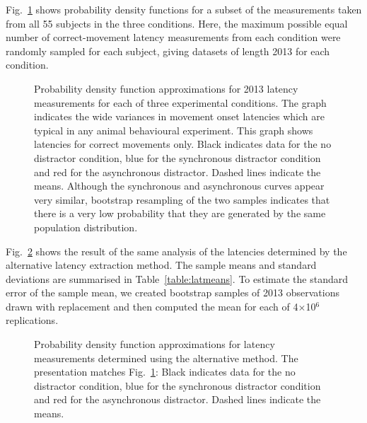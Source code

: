 \documentclass[10pt,letterpaper]{article}
\begin{document}
Fig.~\ref{data_density} shows probability density functions for a
subset of the measurements taken from all 55 subjects in the three
conditions. Here, the maximum possible equal number of
correct-movement latency measurements from each condition were
randomly sampled for each subject, giving datasets of length 2013 for
each condition.

\begin{figure}[htb!]
\centering
\caption[Latency measurement PDF] {Probability density function
  approximations for 2013 latency measurements for each of three
  experimental conditions. The graph indicates the wide variances in
  movement onset latencies which are typical in any animal behavioural
  experiment. This graph shows latencies for correct movements
  only. Black indicates data for the no distractor condition, blue for
  the synchronous distractor condition and red for the asynchronous
  distractor. Dashed lines indicate the means. Although the
  synchronous and asynchronous curves appear very similar, bootstrap
  resampling of the two samples indicates that there is a very low
  probability that they are generated by the same population
  distribution.}
\label{data_density}
\end{figure}

Fig.~\ref{data_density_alt} shows the result of the same analysis of
the latencies determined by the alternative latency extraction
method. The sample means and standard deviations are summarised in
Table~\ref{table:latmeans}. To estimate the standard error of the
sample mean, we created bootstrap samples of 2013 observations drawn
with replacement and then computed the mean for each of
4$\times$10$^6$ replications.

\begin{figure}[htb!]
\centering
\caption[Latency measurement PDF] {Probability density function
  approximations for latency measurements determined using the
  alternative method. The presentation matches Fig.~\ref{data_density}:
  Black indicates data for the no distractor condition, blue for the
  synchronous distractor condition and red for the asynchronous
  distractor. Dashed lines indicate the means.}
\label{data_density_alt}
\end{figure}
\end{document}
